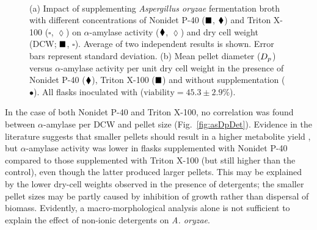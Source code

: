 \begin{figure}[htbp]
	\captionsetup[subfloat]{position=top}
	\centering
	\\
	\caption{(a) Impact of supplementing \emph{Aspergillus oryzae} fermentation broth with different concentrations of Nonidet P-40 ($\blacksquare$, $\blacklozenge$) and Triton X-100 ($\square$, $\lozenge$) on $\alpha$-amylase activity ($\blacklozenge$, $\lozenge$) and dry cell weight (DCW; $\blacksquare$, $\square$). Average of two independent results is shown. Error bars represent standard deviation. (b) Mean pellet diameter ($D_p$) versus $\alpha$-amylase activity per unit dry cell weight in the presence of Nonidet P-40 ($\blacklozenge$), Triton X-100 ($\blacksquare$) and without supplementation ($\bullet$). All flasks inoculated with  ($\mbox{viability} = 45.3 \pm 2.9$\%).}
\end{figure}

In the case of both Nonidet P-40 and Triton X-100, no correlation was found between $\alpha$-amylase per DCW and pellet size (Fig.~\ref{fig:asDpDet}). Evidence in the literature suggests that smaller pellets should result in a higher metabolite yield \cite{dobson2008b,elenshasy2006,couri2003,ali2006,xu2000}, but $\alpha$-amylase activity was lower in flasks supplemented with Nonidet P-40 compared to those supplemented with Triton X-100 (but still higher than the control), even though the latter produced larger pellets. This may be explained by the lower dry-cell weights observed in the presence of detergents; the smaller pellet sizes may be partly caused by inhibition of growth rather than dispersal of biomass. Evidently, a macro-morphological analysis alone is not sufficient to explain the effect of non-ionic detergents on \emph{A. oryzae}.

